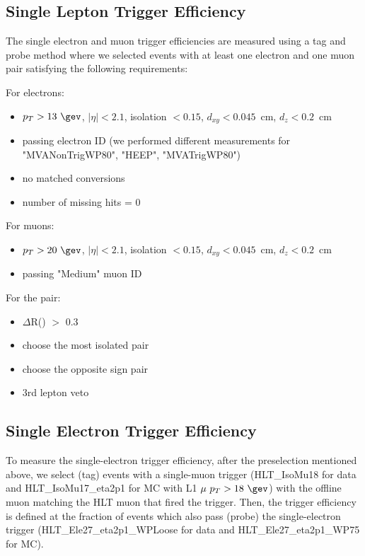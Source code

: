 \subsection{Single Lepton Trigger Efficiency}\label{sec:lepTrigger}
The single electron and muon trigger efficiencies are measured
using a tag and probe method where we selected events with at 
least one electron and one muon pair satisfying the following
requirements:

For electrons:
\begin{itemize}
  \item $p_T > 13~\gev$, $|\eta| < 2.1$, isolation $< 0.15$, $d_{xy}<0.045$~cm, $d_{z}<0.2$~cm
  \item passing electron ID (we performed different measurements for "MVANonTrigWP80", "HEEP", "MVATrigWP80")
  \item no matched conversions
  \item number of missing hits = 0
\end{itemize}

For muons:
\begin{itemize}
  \item $p_T > 20~\gev$, $|\eta| < 2.1$, isolation $< 0.15$, $d_{xy}<0.045$~cm, $d_{z}<0.2$~cm
  \item passing "Medium" muon ID
\end{itemize}

For the pair:
\begin{itemize}
  \item $\Delta$R(\tetm) $>$ 0.3
  \item choose the most isolated pair
  \item choose the opposite sign pair
  \item 3rd lepton veto
\end{itemize}

\subsection{Single Electron Trigger Efficiency}\label{sec:eleTrigger}
To measure the single-electron trigger efficiency, after the
preselection mentioned above, we select (tag) events with a
single-muon trigger (HLT\_IsoMu18 for data and HLT\_IsoMu17\_eta2p1
for MC with L1 $\mu~p_{T} > 18~\gev$) with the offline muon matching
the HLT muon that fired the trigger.  Then, the trigger efficiency is
defined at the fraction of events which also pass (probe) the
single-electron trigger (HLT\_Ele27\_eta2p1\_WPLoose for data and
HLT\_Ele27\_eta2p1\_WP75 for MC).

